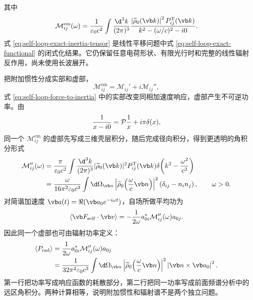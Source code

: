 其中
\begin{equation}
 \mathcal M_{ij}^{\mathrm{em}}(\omega)
 ={1\over\varepsilon_0c^2}
 \int{\d^3k\over(2\pi)^3}
 {\left|\widetilde\rho_0(\vb k)\right|^2P_{ij}^{\mathrm T}(\vb k)
 \over k^2-(\omega/c)^2-i0}.
 \label{eq:self-loop-exact-inertia-tensor}
\end{equation}
式 \eqref{eq:self-loop-exact-inertia-tensor} 是线性平移问题中式 \eqref{eq:self-loop-exact-functional} 的闭式化结果。它仍保留任意电荷形状、有限光行时和完整的线性辐射反作用，尚未使用长波展开。

把附加惯性分成实部和虚部，
\begin{equation*}
 \mathcal M_{ij}^{\mathrm{em}}
 =\mathcal M_{ij}'+i\mathcal M_{ij}'',
\end{equation*}
式 \eqref{eq:self-loop-force-to-inertia} 中的实部改变同相加速度响应，虚部产生不可逆功率。由
\begin{equation*}
 {1\over x-i0}=\mathcal P{1\over x}+i\pi\delta(x),
\end{equation*}
同一个 $\mathcal M_{ij}^{\mathrm{em}}$ 的虚部先写成三维壳层积分，随后完成径向积分，得到更透明的角积分形式
\begin{align}
 \mathcal M_{ij}''(\omega)
 &= {\pi\over\varepsilon_0c^2}
 \int{\d^3k\over(2\pi)^3}
 |\widetilde\rho_0(\vb k)|^2P_{ij}^{\mathrm T}(\vb k)
 \delta\!\left(k^2-{\omega^2\over c^2}\right)
 \notag\\
 &= {\omega\over16\pi^2\varepsilon_0c^3}
 \int\d\Omega_{\vb n}
 \left|\widetilde\rho_0\!\left({\omega\over c}\vb n\right)\right|^2
 \left(\delta_{ij}-n_i n_j\right),
 \qquad \omega>0.
 \label{eq:self-loop-imaginary-inertia-angular}
\end{align}
对简谐加速度 $\vb a(t)=\Re(\vb a_0e^{-i\omega t})$，自场所做平均功为
\begin{equation*}
 \left\langle\vb F_{\mathrm{self}}\cdot\vb v\right\rangle
 =-{1\over2\omega}a_{0i}^*\mathcal M_{ij}''(\omega)a_{0j}.
\end{equation*}
因此同一个虚部也可由辐射功率定义：
\begin{align}
 \left\langle P_{\mathrm{rad}}\right\rangle
 &={1\over2\omega}a_{0i}^*\mathcal M_{ij}''(\omega)a_{0j}
 \notag\\
 &={1\over32\pi^2\varepsilon_0c^3}
 \int\d\Omega_{\vb n}
 \left|\widetilde\rho_0\!\left({\omega\over c}\vb n\right)\right|^2
 \left|\vb n\times\vb a_0\right|^2.
 \label{eq:self-loop-radiation-from-inertia}
\end{align}
第一行把功率写成响应函数的耗散部分，第二行把同一功率写成前面频谱分析中的远区角积分。两种计算相等，说明附加惯性和辐射谱不是两个独立问题。

